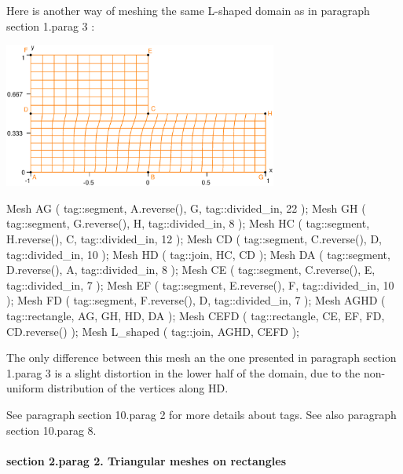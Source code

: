 Here is another way of meshing the same L-shaped domain as in paragraph
\numb section 1.\numb parag 3 :

{ 
\centerline{\includegraphics[width=90mm]{L-shaped-distorted.eps}} }

\verbatim
   Mesh AG ( tag::segment, A.reverse(), G, tag::divided_in, 22 );
   Mesh GH ( tag::segment, G.reverse(), H, tag::divided_in, 8 );
   Mesh HC ( tag::segment, H.reverse(), C, tag::divided_in, 12 );
   Mesh CD ( tag::segment, C.reverse(), D, tag::divided_in, 10 );
   Mesh HD ( tag::join, HC, CD );
   Mesh DA ( tag::segment, D.reverse(), A, tag::divided_in, 8 );
   Mesh CE ( tag::segment, C.reverse(), E, tag::divided_in, 7 );
   Mesh EF ( tag::segment, E.reverse(), F, tag::divided_in, 10 );
   Mesh FD ( tag::segment, F.reverse(), D, tag::divided_in, 7 );
   Mesh AGHD ( tag::rectangle, AG, GH, HD, DA );
   Mesh CEFD ( tag::rectangle, CE, EF, FD, CD.reverse() );
   Mesh L_shaped ( tag::join, AGHD, CEFD );
\endverbatim

The only difference between this mesh an the one presented in paragraph \numb section 1.\numb parag 3
is a slight distortion in the lower half of the domain,
due to the non-uniform distribution of the vertices along {\codett HD}.

See paragraph \numb section 10.\numb parag 2 for more details about tags.
See also paragraph \numb section 10.\numb parag 8.


\vfil\eject
\paragraph{\numb section 2.\numb parag 2. Triangular meshes on rectangles}

